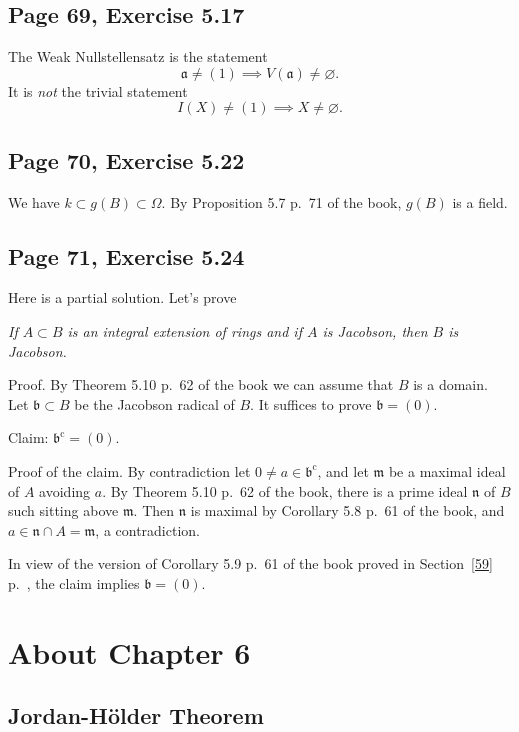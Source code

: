 \documentclass[parskip=half,fontsize=12pt]{scrartcl}%
\newcommand{\oo}{\operatorname}\newcommand{\ooo}{\operatorname*}
\newcommand{\mf}{\mathfrak}
\begin{document}
\subsection{Page 69, Exercise 5.17}%

The Weak Nullstellensatz is the statement
$$
\mf a\ne(1)\implies V(\mf a)\ne\varnothing.
$$ 
It is \emph{not} the trivial statement 
$$
I(X)\ne(1)\implies X\ne\varnothing.
$$

\subsection{Page 70, Exercise 5.22}%

We have $k\subset g(B)\subset\Omega$. By Proposition 5.7 p.~71 of the book, $g(B)$ is a field.

\subsection{Page 71, Exercise 5.24}%

Here is a partial solution. Let's prove 

\emph{If $A\subset B$ is an integral extension of rings and if $A$ is Jacobson, then $B$ is Jacobson.}

Proof. By Theorem 5.10 p.~62 of the book we can assume that $B$ is a domain. Let $\mf b\subset B$ be the Jacobson radical of $B$. It suffices to prove $\mf b=(0)$.

Claim: $\mf b^{\oo c}=(0)$. 

Proof of the claim. By contradiction let $0\ne a\in\mf b^{\oo c}$, and let $\mf m$ be a maximal ideal of $A$ avoiding $a$. By Theorem 5.10 p.~62 of the book, there is a prime ideal $\mf n$ of $B$ such sitting above $\mf m$. Then $\mf n$ is maximal by Corollary 5.8 p.~61 of the book, and $a\in\mf n\cap A=\mf m$, a contradiction.

In view of the version of Corollary 5.9 p.~61 of the book proved in Section~\ref{59} p.~\pageref{59}, the claim implies $\mf b=(0)$.

\section{About Chapter 6}%

\subsection{Jordan-Hölder Theorem}%
\end{document}
